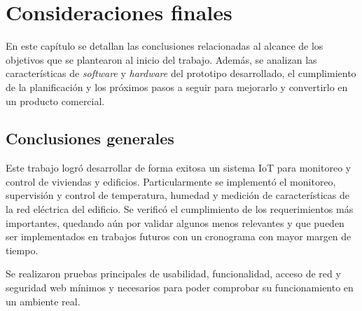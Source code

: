 
\chapter{Consideraciones finales} %

\label{Chapter5} %

En este capítulo se detallan las conclusiones relacionadas al alcance de los objetivos que se plantearon al inicio del trabajo. Además, se analizan las características de \emph{software} y \emph{hardware} del prototipo desarrollado, el cumplimiento de la planificación y los próximos pasos a seguir para mejorarlo y convertirlo en un producto comercial.




\section{Conclusiones generales }

Este trabajo logró desarrollar de forma exitosa un sistema IoT para monitoreo y control de viviendas y edificios. Particularmente se implementó el monitoreo, supervisión y control de temperatura, humedad y medición de características de la red eléctrica del edificio. Se verificó el cumplimiento de los requerimientos más importantes, quedando aún por validar algunos menos relevantes y que pueden ser implementados en trabajos futuros con un cronograma con mayor margen de tiempo.





Se realizaron pruebas principales de usabilidad, funcionalidad, acceso de red y seguridad web mínimos y necesarios para poder comprobar su funcionamiento en un ambiente real. 




